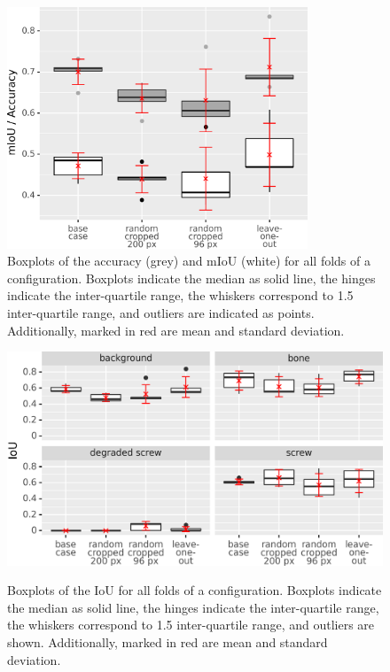\begin{figure}[p]
    \centering
    \includegraphics[width=0.8\textwidth]{pictures/experiment_2/compare_all_model_stats_mIoU_accuracy}\\
    \caption[Boxplots of mIoU and Accuracy for Best Models]{Boxplots of the accuracy (grey) and mIoU (white) for all folds of a configuration. Boxplots indicate the median as solid line, the hinges indicate the inter-quartile range, the whiskers correspond to 1.5 inter-quartile range, and outliers are indicated as points. Additionally, marked in red are mean and standard deviation.\\}
    \label{fig:accuracy-mIoU-boxplots}
    \centering
    \includegraphics[width=\textwidth]{pictures/experiment_2/compare_all_model_stats_labelwise}\\
    \caption[Labelwise Boxplots of IoU for Best Models]{Boxplots of the IoU for all folds of a configuration. Boxplots indicate the median as solid line, the hinges indicate the inter-quartile range, the whiskers correspond to 1.5 inter-quartile range, and outliers are shown. Additionally, marked in red are mean and standard deviation.}
    \label{fig:mIoU-boxplots-labelwise}
\end{figure}


